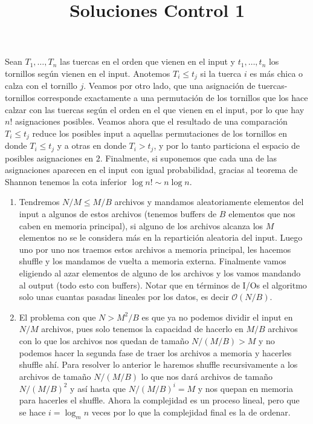 \documentclass[dcc,uchile]{fcfmcourse}
\title{Soluciones Control 1}
\theoremstyle{plain}
\theoremstyle{definition}
\begin{document}
\maketitle


\vspace{-1ex}


\begin{problems}
\problem Sean $T_{1}, \ldots, T_{n}$ las tuercas en el orden que vienen en el input y $t_{1},\ldots , t_{n}$ los tornillos según vienen en el input. Anotemos $T_{i} \le t_{j}$ si la tuerca $i$ es más chica o calza con el tornillo $j$. Veamos por otro lado, que una asignación de tuercas-tornillos corresponde exactamente a una permutación de los tornillos que los hace calzar con las tuercas según el orden en el que vienen en el input, por lo que hay $n!$ asignaciones posibles. Veamos ahora que el resultado de una comparación $T_{i} \le t_{j}$ reduce los posibles input a aquellas permutaciones de los tornillos en donde $T_{i} \le t_{j}$ y a otras en donde $T_{i} > t_{j}$, y por lo tanto particiona el espacio de posibles asignaciones en $2$. Finalmente, si suponemos que cada una de las asignaciones aparecen en el input con igual probabilidad, gracias al teorema de Shannon tenemos la cota inferior $\log{n!} \sim n\log{n}$.
\problem 
\begin{enumerate}[1.]
    \item Tendremos $N/M \le M/B$ archivos y mandamos aleatoriamente elementos del input a algunos de estos archivos (tenemos buffers de $B$ elementos que nos caben en memoria principal), si alguno de los archivos alcanza los $M$ elementos no se le considera más en la repartición aleatoria del input. Luego uno por uno nos traemos estos archivos a memoria principal, les hacemos shuffle y los mandamos de vuelta a memoria externa. Finalmente vamos eligiendo al azar elementos de alguno de los archivos y los vamos mandando al output (todo esto con buffers). Notar que en términos de I/Os el algoritmo solo unas cuantas pasadas lineales por los datos, es decir $\mathcal{O}(N/B)$.
    \item El problema con que $N>M^2/B$ es que ya no podemos dividir el input en $N/M$ archivos, pues solo tenemos la capacidad de hacerlo en $M/B$ archivos con lo que los archivos nos quedan de tamaño $N/(M/B)>M$ y no podemos hacer la segunda fase de traer los archivos a memoria y hacerles shuffle ahí. Para resolver lo anterior le haremos shuffle recursivamente a los archivos de tamaño $N/(M/B)$ lo que nos dará archivos de tamaño $N/(M/B)^2$ y así hasta que $N/(M/B)^i = M$ y nos quepan en memoria para hacerles el shuffle. Ahora la complejidad es un proceso lineal, pero que se hace $i=\log_{m}n$ veces por lo que la complejidad final es la de ordenar.

\end{enumerate}
\end{problems}
\end{document}
